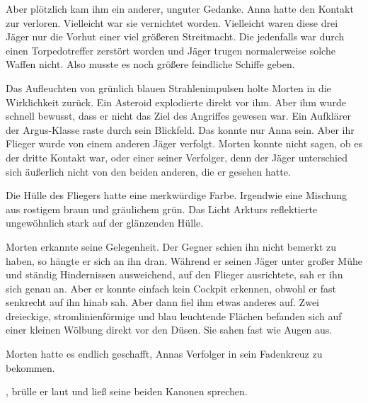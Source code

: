 \par

Aber plötzlich kam ihm ein anderer, unguter Gedanke. Anna hatte den Kontakt zur  verloren. Vielleicht war sie vernichtet worden. Vielleicht waren diese drei Jäger nur die Vorhut einer viel größeren Streitmacht. Die  jedenfalls war durch einen Torpedotreffer zerstört worden und Jäger trugen normalerweise solche Waffen nicht. Also musste es noch größere feindliche Schiffe geben.

\par

Das Aufleuchten von grünlich blauen Strahlenimpulsen holte Morten in die Wirklichkeit zurück. Ein Asteroid explodierte direkt vor ihm. Aber ihm wurde schnell bewusst, dass er nicht das Ziel des Angriffes gewesen war. Ein Aufklärer der Argus-Klasse raste durch sein Blickfeld. Das konnte nur Anna sein. Aber ihr Flieger wurde von einem anderen Jäger verfolgt. Morten konnte nicht sagen, ob es der dritte Kontakt war, oder einer seiner Verfolger, denn der Jäger unterschied sich äußerlich nicht von den beiden anderen, die er gesehen hatte.

\par

Die Hülle des Fliegers hatte eine merkwürdige Farbe. Irgendwie eine Mischung aus rostigem braun und gräulichem grün. Das Licht Arkturs reflektierte ungewöhnlich stark auf der glänzenden Hülle.

\par

Morten erkannte seine Gelegenheit. Der Gegner schien ihn nicht bemerkt zu haben, so hängte er sich an ihn dran. Während er seinen Jäger unter großer Mühe und ständig Hindernissen ausweichend, auf den Flieger ausrichtete, sah er ihn sich genau an. Aber er konnte einfach kein Cockpit erkennen, obwohl er fast senkrecht auf ihn hinab sah. Aber dann fiel ihm etwas anderes auf. Zwei dreieckige, stromlinienförmige und blau leuchtende Flächen befanden sich auf einer kleinen Wölbung direkt vor den Düsen. Sie sahen fast wie Augen aus.

\par

Morten hatte es endlich geschafft, Annas Verfolger in sein Fadenkreuz zu bekommen.

\par

, brülle er laut und ließ seine beiden Kanonen sprechen.

\par

